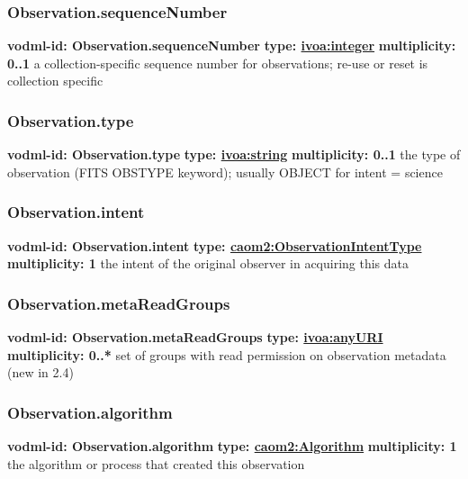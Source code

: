     \subsubsection{Observation.sequenceNumber}
      \textbf{vodml-id: Observation.sequenceNumber} \newline
      \textbf{type: \hyperref[sect:ivoa]{ivoa:integer}} \newline
      \textbf{multiplicity: 0..1} \newline
      a collection-specific sequence number for observations; re-use or reset is collection specific

    \subsubsection{Observation.type}
      \textbf{vodml-id: Observation.type} \newline
      \textbf{type: \hyperref[sect:ivoa]{ivoa:string}} \newline
      \textbf{multiplicity: 0..1} \newline
      the type of observation (FITS OBSTYPE keyword); usually OBJECT for intent = science

    \subsubsection{Observation.intent}
      \textbf{vodml-id: Observation.intent} \newline
      \textbf{type: \hyperref[sect:ObservationIntentType]{caom2:ObservationIntentType}} \newline
      \textbf{multiplicity: 1} \newline
      the intent of the original observer in acquiring this data

    \subsubsection{Observation.metaReadGroups}
      \textbf{vodml-id: Observation.metaReadGroups} \newline
      \textbf{type: \hyperref[sect:ivoa]{ivoa:anyURI}} \newline
      \textbf{multiplicity: 0..*} \newline
      set of groups with read permission on observation metadata (new in 2.4)

    \subsubsection{Observation.algorithm}
      \textbf{vodml-id: Observation.algorithm} \newline
      \textbf{type: \hyperref[sect:Algorithm]{caom2:Algorithm}} \newline
      \textbf{multiplicity: 1} \newline
      the algorithm or process that created this observation


